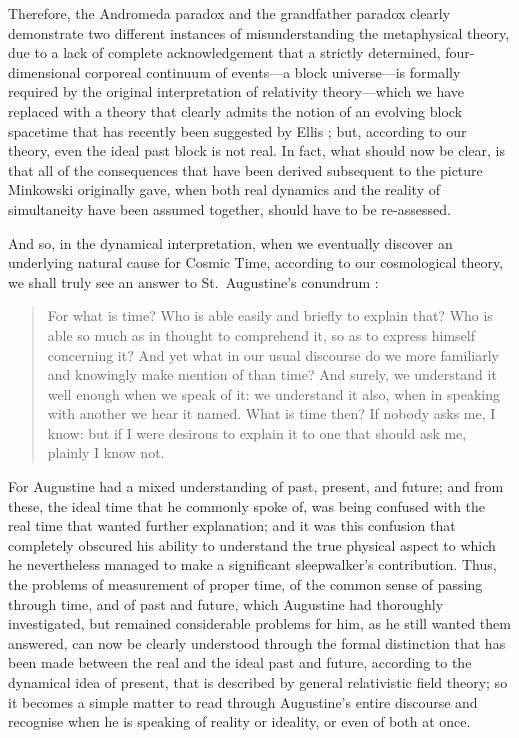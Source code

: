 Therefore, the Andromeda paradox and the grandfather paradox clearly demonstrate two different instances of misunderstanding the metaphysical theory, due to a lack of complete acknowledgement that a strictly determined, four-dimensional corporeal continuum of events---a block universe---is formally required by the original interpretation of relativity theory---which we have replaced with a theory that clearly admits the notion of an evolving block spacetime that has recently been suggested by Ellis \cite{Ellis2007}; but, according to our theory, even the ideal past block is not real. In fact, what should now be clear, is that all of the consequences that have been derived subsequent to the picture Minkowski originally gave, when both real dynamics and the reality of simultaneity have been assumed together, should have to be re-assessed.

And so, in the dynamical interpretation, when we eventually discover an underlying natural cause for Cosmic Time, according to our cosmological theory, we shall truly see an answer to St.~Augustine's conundrum \cite{Augustine1912}:
\begin{quotation}
For what is time? Who is able easily and briefly to explain that? Who is able so much as in thought to comprehend it, so as to express himself concerning it? And yet what in our usual discourse do we more familiarly and knowingly make mention of than time? And surely, we understand it well enough when we speak of it: we understand it also, when in speaking with another we hear it named. What is time then? If nobody asks me, I know: but if I were desirous to explain it to one that should ask me, plainly I know not.
\end{quotation}
For Augustine had a mixed understanding of past, present, and future; and from these, the ideal time that he commonly spoke of, was being confused with the real time that wanted further explanation; and it was this confusion that completely obscured his ability to understand the true physical aspect to which he nevertheless managed to make a significant sleepwalker's contribution. Thus, the problems of measurement of proper time, of the common sense of passing through time, and of past and future, which Augustine had thoroughly investigated, but remained considerable problems for him, as he still wanted them answered, can now be clearly understood through the formal distinction that has been made between the real and the ideal past and future, according to the dynamical idea of present, that is described by general relativistic field theory; so it becomes a simple matter to read through Augustine's entire discourse and recognise when he is speaking of reality or ideality, or even of both at once. 
